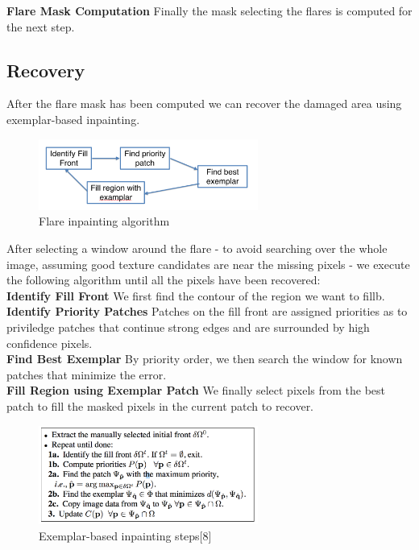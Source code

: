 \documentclass[11pt,twocolumn]{article}
\begin{document}
\textbf{Flare Mask Computation} Finally the mask selecting the flares is computed for the next step.

\subsection{Recovery}

After the flare mask has been computed we can recover the damaged area using exemplar-based inpainting.

\begin{figure}[ht!]
\centering
\includegraphics[width=72mm]{flow_inpainting.png}
\caption{Flare inpainting algorithm}
\end{figure}

After selecting a window around the flare - to avoid searching over the whole image, assuming good texture candidates are near the missing pixels - we execute the following algorithm until all the pixels have been recovered:
\\

\textbf{Identify Fill Front} We first find the contour of the region we want to fillb.
\\

\textbf{Identify Priority Patches} Patches on the fill front are assigned priorities as to priviledge patches that continue strong edges and are surrounded by high confidence pixels.
\\

\textbf{Find Best Exemplar} By priority order, we then search the window for known patches that minimize the error.
\\

\textbf{Fill Region using Exemplar Patch} We finally select pixels from the best patch to fill the masked pixels in the current patch to recover.

\begin{figure}[ht!]
\centering
\includegraphics[width=72mm]{algo_inpainting.png}
\caption{Exemplar-based inpainting steps[8]}
\end{figure}
\end{document}
